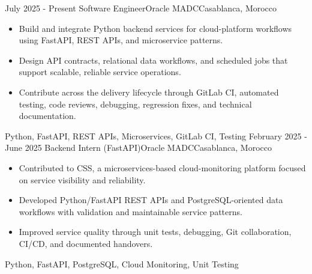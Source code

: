 
\begin{experiences}
  \experience
    {July 2025 - Present}
    {Software Engineer}{Oracle MADC}{Casablanca, Morocco}
    {} {
      \begin{itemize}
        \item Build and integrate Python backend services for cloud-platform workflows using FastAPI, REST APIs, and microservice patterns.
        \item Design API contracts, relational data workflows, and scheduled jobs that support scalable, reliable service operations.
        \item Contribute across the delivery lifecycle through GitLab CI, automated testing, code reviews, debugging, regression fixes, and technical documentation.
      \end{itemize}
    }
    {Python, FastAPI, REST APIs, Microservices, GitLab CI, Testing}
  \experience
    {February 2025 - June 2025}
    {Backend Intern (FastAPI)}{Oracle MADC}{Casablanca, Morocco}
    {} {
      \begin{itemize}
        \item Contributed to CSS, a microservices-based cloud-monitoring platform focused on service visibility and reliability.
        \item Developed Python/FastAPI REST APIs and PostgreSQL-oriented data workflows with validation and maintainable service patterns.
        \item Improved service quality through unit tests, debugging, Git collaboration, CI/CD, and documented handovers.
      \end{itemize}
    }
    {Python, FastAPI, PostgreSQL, Cloud Monitoring, Unit Testing}
  \emptySeparator
\end{experiences}
